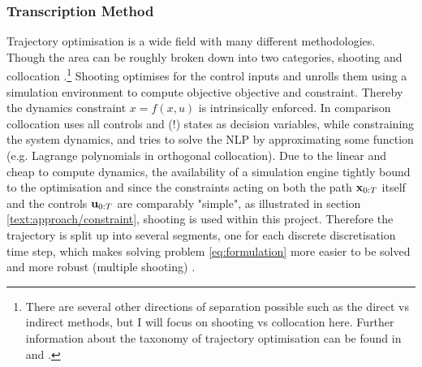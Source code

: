 \subsubsection{Transcription Method} 
Trajectory optimisation is a wide field with many different methodologies. Though the area can be roughly broken down into two categories, shooting and collocation \cite{Kelly2017}.\footnote{There are several other directions of separation possible such as the direct vs indirect methods, but I will focus on shooting vs collocation here. Further information about the taxonomy of trajectory optimisation can be found in \cite{Kelly2017} and \cite{Chai2020}.} Shooting optimises for the control inputs and unrolls them using a simulation environment to compute objective objective and constraint. Thereby the dynamics constraint $x = f(x, u)$ is intrinsically enforced. In comparison collocation uses all controls and (!) states as decision variables, while constraining the system dynamics, and tries to solve the \ac{NLP} by approximating some function (e.g. Lagrange polynomials in orthogonal collocation). Due to the linear and cheap to compute dynamics, the availability of a simulation engine tightly bound to the optimisation and since the constraints acting on both the path $\mathbf{x}_{0:T}$ itself and the controls $\mathbf{u}_{0:T}$ are comparably "simple", as illustrated in section \ref{text:approach/constraint}, shooting is used within this project. Therefore the trajectory is split up into several segments, one for each discrete discretisation time step, which makes solving problem \ref{eq:formulation} more easier to be solved and more robust (multiple shooting) \cite{Betts1998}.

